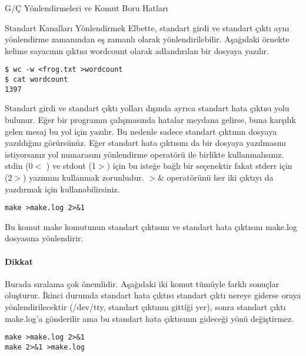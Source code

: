 \begin{section}{G/Ç Yönlendirmeleri ve Komut Boru Hatları}
\begin{subsection}{Standart Kanalları Yönlendirmek}
Elbette, standart girdi ve standart çıktı aynı yönlendirme zamanından eş zamanlı olarak yönlendirilebilir.  Aşağıdaki örnekte kelime sayacının çıktısı wordcount olarak adlandırılan bir dosyaya yazılır.
\begin{verbatim}
$ wc -w <frog.txt >wordcount 
$ cat wordcount 
1397
\end{verbatim}

Standart girdi ve standart çıktı yolları dışında ayrıca standart hata çıktısı yolu bulunur. Eğer bir programın çalışmasında hatalar meydana gelirse, buna karşılık gelen mesaj bu yol için yazılır. Bu nedenle sadece standart çıktının dosyaya yazıldığını görürsünüz. Eğer standart hata çıktısını da bir dosyaya yazılmasını istiyorsanız yol numarasını yönlendirme operatörü ile birlikte kullanmalısınız. stdin (0$<$ ) ve stdout (1$>$) için bu isteğe bağlı bir seçenektir fakat stderr için (2$>$) yazımını kullanmak zorunludur. $>$\& operatörünü her iki çıktıyı da yazdırmak için kullanabilirsiniz.
\begin{verbatim}
make >make.log 2>&1
\end{verbatim}

Bu komut make komutunun standart çıktısını ve standart hata çıktısını make.log dosyasına yönlendirir.

\paragraph{Dikkat}{ Burada sıralama çok önemlidir. Aşağıdaki iki komut tümüyle farklı sonuçlar oluşturur. İkinci durumda standart hata çıktısı standart çıktı nereye giderse oraya yönlendirilecektir (/dev/tty, standart çıktının gittiği yer), sonra standart çıktı make.log'a gönderilir ama bu standart hata çıktısının gideceği yönü değiştirmez.}
\begin{verbatim}
make >make.log 2>&1 
make 2>&1 >make.log 
\end{verbatim}


\end{subsection}
\end{section}

